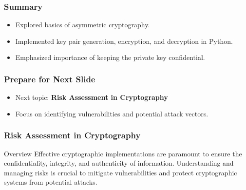 \documentclass{beamer}
\begin{document}
\begin{frame}
    \frametitle{Summary}
    \begin{itemize}
        \item Explored basics of asymmetric cryptography.
        \item Implemented key pair generation, encryption, and decryption in Python.
        \item Emphasized importance of keeping the private key confidential.
    \end{itemize}
\end{frame}

\begin{frame}
    \frametitle{Prepare for Next Slide}
    \begin{itemize}
        \item Next topic: \textbf{Risk Assessment in Cryptography}
        \item Focus on identifying vulnerabilities and potential attack vectors.
    \end{itemize}
\end{frame}

\begin{frame}
    \frametitle{Risk Assessment in Cryptography}
    \begin{block}{Overview}
        Effective cryptographic implementations are paramount to ensure the confidentiality, integrity, and authenticity of information. Understanding and managing risks is crucial to mitigate vulnerabilities and protect cryptographic systems from potential attacks.
    \end{block}
\end{frame}
\end{document}
